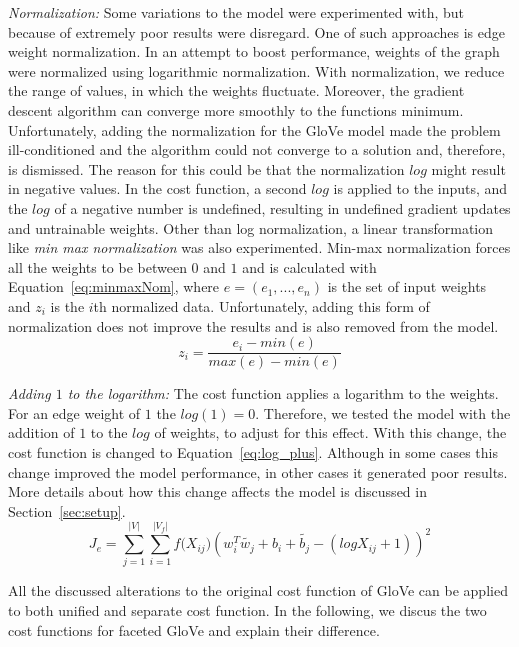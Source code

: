 \begin{compactitem}
\item \emph{Normalization:} Some variations to the model were experimented with, but because of extremely poor results were disregard. One of such approaches is edge weight normalization. In an attempt to boost performance, weights of the graph were normalized using logarithmic normalization. With normalization, we reduce the range of values, in which the weights fluctuate. Moreover, the gradient descent algorithm can converge more smoothly to the functions minimum. Unfortunately, adding the normalization for the GloVe model made the problem ill-conditioned and the algorithm could not converge to a solution and, therefore, is dismissed. The reason for this could be that the normalization $log$ might result in negative values. In the cost function, a second $log$ is applied to the inputs, and the $log$ of a negative number is undefined, resulting in undefined gradient updates and untrainable weights. Other than log normalization, a linear transformation like \emph{min max normalization} was also experimented. Min-max normalization forces all the weights to be between $0$ and $1$ and is calculated with Equation~\ref{eq:minmaxNom}, where $e=(e_1,...,e_n)$ is the set of input weights and $z_i$ is the $i$th normalized data. Unfortunately, adding this form of normalization does not improve the results and is also removed from the model.
\begin{equation}
z_{ i }=\frac { e_{ i }-min(e) }{ max(e)-min(e) } 
\label{eq:minmaxNom}
\end{equation}

\item \emph{Adding $1$ to the logarithm:} The cost function applies a logarithm to the weights. For an edge weight of $1$ the $log(1)=0$. Therefore, we tested the model with the addition of $1$ to the $log$ of weights, to adjust for this effect. With this change, the cost function is changed to Equation~\ref{eq:log_plus}. Although in some cases this change improved the model performance, in other cases it generated poor results. More details about how this change affects the model is discussed in Section~\ref{sec:setup}. 
\begin{equation}
J_e=\sum _{ j=1 }^{ |V| }{}\sum _{ i=1 }^{ |V_f| }{ f({ X }_{ ij } } )(w_{ i }^{ T }\tilde{  w_{ j } } +b_{ i }+\tilde{  b_{ j } } -(log{ X }_{ ij }+1))^2
\label{eq:log_plus}
\end{equation}
\end{compactitem}
All the discussed alterations to the original cost function of GloVe can be applied to both unified and separate cost function. In the following, we discus the two cost functions for faceted GloVe and explain their difference. 
